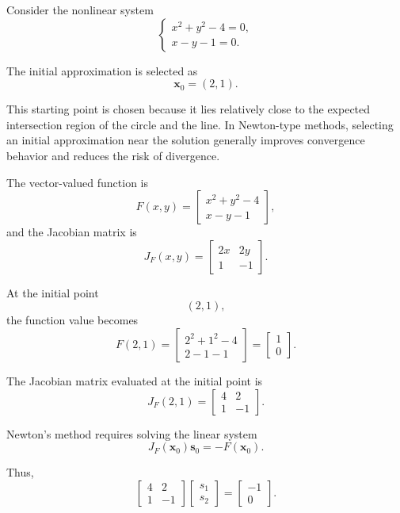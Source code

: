 Consider the nonlinear system
\begin{equation}
\begin{cases}
x^2 + y^2 - 4 = 0, \\
x - y - 1 = 0.
\end{cases}
\end{equation}

The initial approximation is selected as
\[
\mathbf{x}_0=(2,1).
\]

This starting point is chosen because it lies relatively close to the expected intersection region of the circle and the line. In Newton-type methods, selecting an initial approximation near the solution generally improves convergence behavior and reduces the risk of divergence.

The vector-valued function is
\[
F(x,y)=
\begin{bmatrix}
x^2+y^2-4 \\
x-y-1
\end{bmatrix},
\]
and the Jacobian matrix is
\[
J_F(x,y)=
\begin{bmatrix}
2x & 2y \\
1 & -1
\end{bmatrix}.
\]

At the initial point
\[
(2,1),
\]
the function value becomes
\[
F(2,1)=
\begin{bmatrix}
2^2+1^2-4 \\
2-1-1
\end{bmatrix}
=
\begin{bmatrix}
1 \\
0
\end{bmatrix}.
\]

The Jacobian matrix evaluated at the initial point is
\[
J_F(2,1)=
\begin{bmatrix}
4 & 2 \\
1 & -1
\end{bmatrix}.
\]

Newton's method requires solving the linear system
\[
J_F(\mathbf{x}_0)\mathbf{s}_0
=
-F(\mathbf{x}_0).
\]

Thus,
\[
\begin{bmatrix}
4 & 2 \\
1 & -1
\end{bmatrix}
\begin{bmatrix}
s_1 \\
s_2
\end{bmatrix}
=
\begin{bmatrix}
-1 \\
0
\end{bmatrix}.
\]

